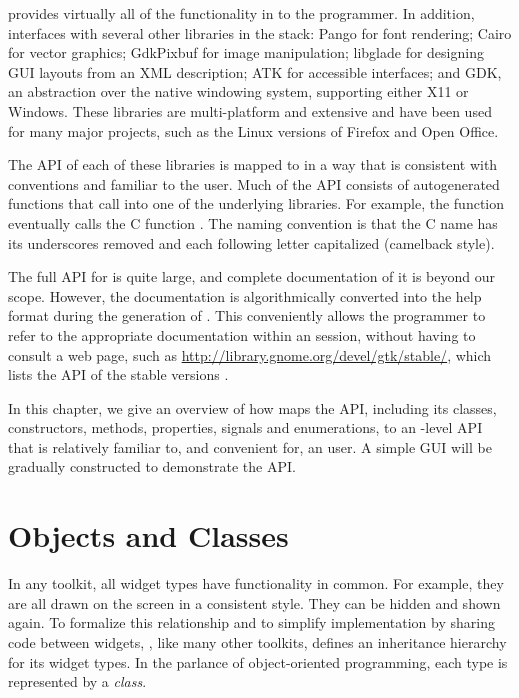  provides virtually all of the functionality in \GTK\/ to
the \R\/ programmer. In addition,  interfaces with several
other libraries in the \GTK\/ stack: Pango for font rendering; Cairo
for vector graphics; GdkPixbuf for image manipulation; libglade for
designing GUI layouts from an XML description; ATK for accessible
interfaces; and GDK, an abstraction over the native windowing system,
supporting either X11 or Windows. These libraries are multi-platform
and extensive and have been used for many major projects, such as the
Linux versions of Firefox and Open Office.

The API of each of these libraries is mapped to \R\/ in a way that is
consistent with \R\/ conventions and familiar to the \R\/
user. Much of the  API consists of autogenerated \R\/
functions that call into one of the underlying libraries. For
example, the \R\/ function  eventually calls
the C function . The naming convention is
that the C name has its underscores removed and each following letter
capitalized (camelback style).

The full API for \GTK\/ is quite large, and complete documentation of
it is beyond our scope. However, the \GTK\/ documentation is
algorithmically converted into the \R\/ help format during the
generation of . This conveniently allows the programmer to
refer to the appropriate documentation within an \R\/ session, without
having to consult a web page, such as
\url{http://library.gnome.org/devel/gtk/stable/}, which lists the
 API of the stable versions \GTK.

In this chapter, we give an overview of how  maps the
\GTK\/ API, including its classes, constructors, methods, properties,
signals and enumerations, to an \R-level API that is relatively
familiar to, and convenient for, an \R\/ user. A simple GUI will be
gradually constructed to demonstrate the API.


\section{Objects and Classes}

In any toolkit, all widget types have functionality in common. For
example, they are all drawn on the screen in a consistent style. They
can be hidden and shown again. To formalize this relationship and to
simplify implementation by sharing code between widgets, ,
like many other toolkits, defines an inheritance hierarchy for its
widget types. In the parlance of object-oriented programming, each
type is represented by a \textit{class}.

